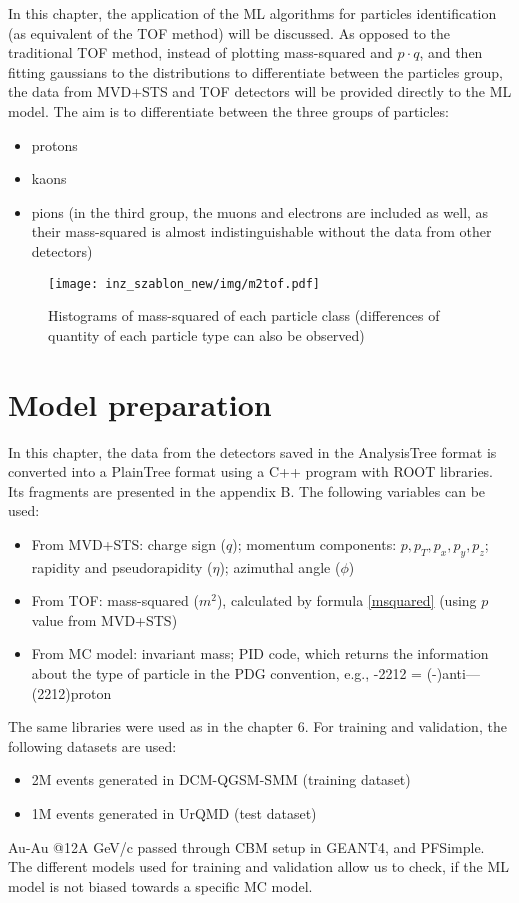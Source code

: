 \pagestyle{fancy}
In this chapter, the application of the ML algorithms for particles identification (as equivalent of the TOF method) will be discussed. As opposed to the traditional TOF method, instead of plotting mass-squared and $p \cdot q$, and then fitting gaussians to the distributions to differentiate between the particles group, the data from MVD+STS and TOF detectors will be provided directly to the ML model. The aim is to differentiate between the three groups of particles:
\begin{itemize}
    \item protons
    \item kaons
    \item pions (in the third group, the muons and electrons are included as well, as their mass-squared is almost indistinguishable without the data from other detectors)
\end{itemize}
\begin{figure}[h!]
    \centering
    \texttt{[image: inz\_szablon\_new/img/m2tof.pdf]}
    \caption{Histograms of mass-squared of each particle class (differences of quantity of each particle type can also be observed)}
\end{figure}

\section{Model preparation}\thispagestyle{fancy}
In this chapter, the data from the detectors saved in the AnalysisTree format is converted into a PlainTree format using a C++ program with ROOT libraries. Its fragments are presented in the appendix B. The following variables can be used:
\begin{itemize}
    \item From MVD+STS: charge sign ($q$); momentum components: $p, p_T, p_x, p_y, p_z$; rapidity and pseudorapidity ($\eta$); azimuthal angle ($\phi$)
    \item From TOF: mass-squared ($m^2$), calculated by formula \ref{msquared} (using $p$ value from MVD+STS)
    \item From MC model: invariant mass; PID code, which returns the information about the type of particle in the PDG convention, e.g., -2212 = (-)anti—(2212)proton\cite{hepnames}
\end{itemize}
The same libraries were used as in the chapter 6. For training and validation, the following datasets are used:
\begin{itemize}
    \item 2M events generated in DCM-QGSM-SMM (training dataset)
    \item 1M events generated in UrQMD (test dataset)
\end{itemize}
Au-Au @12A GeV/c passed through CBM setup in GEANT4, and PFSimple. The different models used for training and validation allow us to check, if the ML model is not biased towards a specific MC model. 
